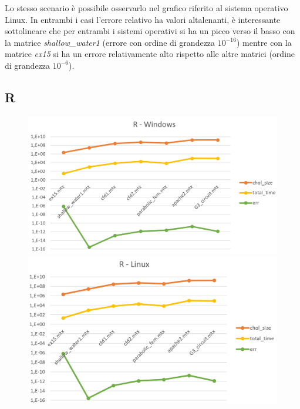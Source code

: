 \documentclass[a4paper,12pt]{article}
\begin{document}
\noindent Lo stesso scenario è possibile osservarlo nel grafico riferito al sistema operativo Linux.
In entrambi i casi l’errore relativo ha valori altalenanti, è interessante sottolineare che per entrambi i sistemi operativi si ha un picco verso il basso con la matrice \textit{shallow\_water1} (errore con ordine di grandezza $10^{-16}$) mentre con la matrice \textit{ex15} si ha un errore relativamente alto rispetto alle altre matrici (ordine di grandezza $10^{-6}$).

\subsection{R}


\begin{figure}[H]
\centering
\begin{minipage}{.5\textwidth}
  \centering
  \includegraphics[width=1\linewidth]{img/Rwin.png}
\end{minipage}%
\begin{minipage}{.5\textwidth}
  \centering
  \includegraphics[width=1\linewidth]{img/Rlinux.png}
\end{minipage}
\end{figure}
\end{document}
